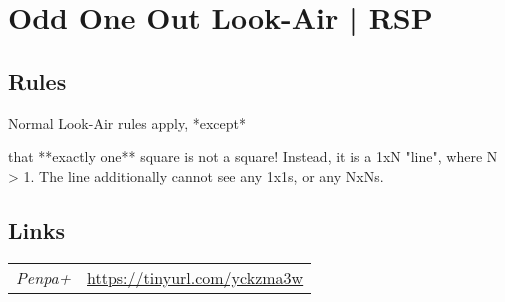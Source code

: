 \section[Odd One Out Look-Air | RSP {[\emph{Look-Air (Odd One Out)}]}]{Odd One Out Look-Air | {\normalfont RSP}}
\label{sec:45-odd-one-out-look-air-rsp}

\subsection*{Rules}
\begin{markdown}
Normal Look-Air rules apply, *except*



that **exactly one** square is not a square! Instead, it is a 1xN "line", where N > 1. The line additionally cannot see any 1x1s, or any NxNs.
\end{markdown}
\subsection*{Links}
\begin{tabularx}{\textwidth}{l X}
\emph{Penpa+} & \url{https://tinyurl.com/yckzma3w} \\
\end{tabularx}
\pagebreak
